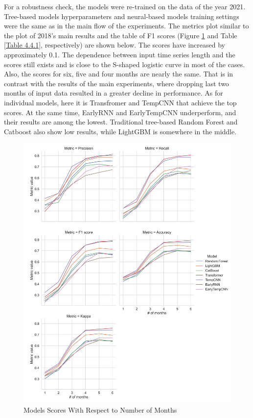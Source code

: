 \documentclass{article}
\begin{document}
For a robustness check, the models were re-trained on the data of the year 2021. Tree-based models hyperparameters and neural-based models training settings were the same as in the main flow of the experiments. The metrics plot similar to the plot of 2018's main results and the table of F1 scores (Figure \ref{Figure 4.4.1} and Table \ref{Table 4.4.1}, respectively) are shown below. The scores have increased by approximately 0.1. The dependence between input time series length and the scores still exists and is close to the S-shaped logistic curve in most of the cases. Also, the scores for six, five and four months are nearly the same. That is in contrast with the results of the main experiments, where dropping last two months of input data resulted in a greater decline in performance. As for individual models, here it is Transfromer and TempCNN that achieve the top scores. At the same time, EarlyRNN and EarlyTempCNN underperform, and their results are among the lowest. Traditional tree-based Random Forest and Catboost also show low results, while LightGBM is somewhere in the middle.


\begin{figure}
    \centering
    \includegraphics[width=\textwidth]{images/metrics_plot_2021.png}
    \caption{Models Scores With Respect to Number of Months}
    \label{Figure 4.4.1}
\end{figure}
\end{document}
